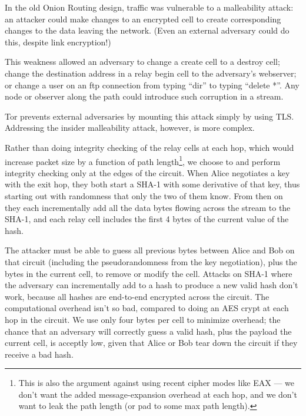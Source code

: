 \documentclass[times,10pt,twocolumn]{article}
\begin{document}

In the old Onion Routing design, traffic was vulnerable to a
malleability attack: an attacker could make changes to an encrypted
cell to create corresponding changes to the data leaving the network.
(Even an external adversary could do this, despite link encryption!)

This weakness allowed an adversary to change a create cell to a destroy
cell; change the destination address in a relay begin cell to the
adversary's webserver; or change a user on an ftp connection from
typing ``dir'' to typing ``delete *''. Any node or observer along the
path could introduce such corruption in a stream.

Tor prevents external adversaries by mounting this attack simply by
using TLS. Addressing the insider malleability attack, however, is
more complex.

Rather than doing integrity checking of the relay cells at each hop,
which would increase packet size
by a function of path length\footnote{This is also the argument against
using recent cipher modes like EAX \cite{eax} --- we don't want the added
message-expansion overhead at each hop, and we don't want to leak the path
length (or pad to some max path length).}, we choose to
and perform integrity
checking only at the edges of the circuit. When Alice negotiates a key
with the exit hop, they both start a SHA-1 with some derivative of that key,
thus starting out with randomness that only the two of them know. From
then on they each incrementally add all the data bytes flowing across
the stream to the SHA-1, and each relay cell includes the first 4 bytes
of the current value of the hash. 

The attacker must be able to guess all previous bytes between Alice
and Bob on that circuit (including the pseudorandomness from the key
negotiation), plus the bytes in the current cell, to remove or modify the
cell. Attacks on SHA-1 where the adversary can incrementally add to a
hash to produce a new valid hash don't work,
because all hashes are end-to-end encrypted across the circuit.
The computational overhead isn't so bad, compared to doing an AES
crypt at each hop in the circuit. We use only four bytes per cell to
minimize overhead; the chance that an adversary will correctly guess a
valid hash, plus the payload the current cell, is acceptly low, given
that Alice or Bob tear down the circuit if they receive a bad hash.
\end{document}

